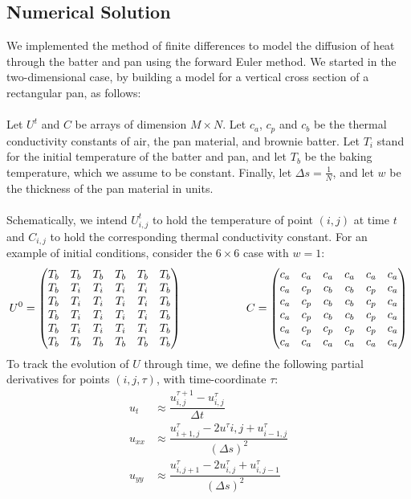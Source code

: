 \documentclass[12pt,draft]{reedmcm}
\begin{document}
\subsection{Numerical Solution}
We implemented the method of finite differences to model the diffusion of heat through the batter and pan using the forward Euler method.  We started in the two-dimensional case, by building a model for a vertical cross section of a rectangular pan, as follows:\\
\\
Let $U^t$ and $C$ be arrays of dimension $M \times N$.  Let $c_a$, $c_p$ and $c_b$ be the thermal conductivity constants of air, the pan material, and brownie batter.  Let $T_i$ stand for the initial temperature of the batter and pan, and let $T_b$ be the baking temperature, which we assume to be constant.  Finally, let $\Delta s = \frac{1}{N}$, and let $w$ be the thickness of the pan material in units.\\
\\
Schematically, we intend $U^t_{i,j}$ to hold the temperature of point $(i,j)$ at time $t$ and $C_{i,j}$ to hold the corresponding thermal conductivity constant.  For an example of initial conditions, consider the $6 \times 6$ case with $w = 1$:
\[U^0 = \begin{pmatrix} T_b&T_b&T_b&T_b&T_b&T_b\\
					T_b&T_i &T_i&T_i&T_i&T_b\\
					T_b&T_i &T_i&T_i&T_i&T_b\\
					T_b&T_i &T_i&T_i&T_i&T_b\\
					T_b&T_i &T_i&T_i&T_i&T_b\\
					T_b&T_b&T_b&T_b&T_b&T_b \end{pmatrix} \hspace{20mm}
  C = \begin{pmatrix} c_a&c_a&c_a&c_a&c_a&c_a\\
				   c_a &c_p &c_b&c_b&c_p&c_a\\
				    c_a &c_p &c_b&c_b&c_p&c_a\\
  				 c_a &c_p &c_b&c_b&c_p&c_a\\
				 c_a &c_p &c_p&c_p&c_p&c_a\\
				c_a&c_a&c_a&c_a&c_a&c_a \end{pmatrix} \]		
To track the evolution of $U$ through time, we define the following partial derivatives for points $(i,j,\tau)$, with time-coordinate $\tau$: \begin{align*}
u_t &\approx \dfrac{u_{i,j}^{\tau+1} - u_{i,j}^\tau}{\Delta t}\\
u_{xx} &\approx \dfrac{u_{i+1,j}^\tau - 2u^\tau{i,j} + u_{i-1,j}^\tau}{(\Delta s)^2}\\
u_{yy} &\approx \dfrac{u_{i,j+1}^\tau - 2u_{i,j}^\tau + u_{i,j-1}^\tau}{(\Delta s)^2} \end{align*}
\end{document}
